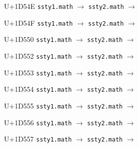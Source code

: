 \documentclass{article}
\begin{document}
\begin{substitutions}
\goodbreak

U+1D54E  \linebreak
    \texttt{ssty1.math} $\to$  \linebreak
    \texttt{ssty2.math} $\to$  

\goodbreak

U+1D54F  \linebreak
    \texttt{ssty1.math} $\to$  \linebreak
    \texttt{ssty2.math} $\to$  

\goodbreak

U+1D550  \linebreak
    \texttt{ssty1.math} $\to$  \linebreak
    \texttt{ssty2.math} $\to$  

\goodbreak

U+1D552  \linebreak
    \texttt{ssty1.math} $\to$  \linebreak
    \texttt{ssty2.math} $\to$  

\goodbreak

U+1D553  \linebreak
    \texttt{ssty1.math} $\to$  \linebreak
    \texttt{ssty2.math} $\to$  

\goodbreak

U+1D554  \linebreak
    \texttt{ssty1.math} $\to$  \linebreak
    \texttt{ssty2.math} $\to$  

\goodbreak

U+1D555  \linebreak
    \texttt{ssty1.math} $\to$  \linebreak
    \texttt{ssty2.math} $\to$  

\goodbreak

U+1D556  \linebreak
    \texttt{ssty1.math} $\to$  \linebreak
    \texttt{ssty2.math} $\to$  

\goodbreak

U+1D557  \linebreak
    \texttt{ssty1.math} $\to$  \linebreak
    \texttt{ssty2.math} $\to$  


\end{substitutions}
\end{document}
